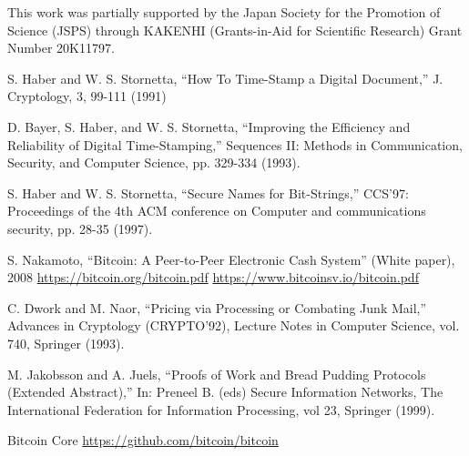 \documentclass[graybox]{svmult}
\begin{document}
\begin{acknowledgement}
 This work was partially supported by the Japan Society for the Promotion of 
Science (JSPS) through KAKENHI (Grants-in-Aid for Scientific Research) Grant 
Number 20K11797. 
\end{acknowledgement}







\begin{thebibliography}{99}

  S. Haber and W. S. Stornetta, 
  ``How To Time-Stamp a Digital Document,''
  J. Cryptology, 3, 99-111 (1991)

  D. Bayer, S. Haber, and W. S. Stornetta,
  ``Improving the Efficiency and Reliability of Digital Time-Stamping,''
  Sequences II: Methods in Communication, Security, and Computer Science, 
  pp. 329-334 (1993).

  S. Haber and W. S. Stornetta, 
  ``Secure Names for Bit-Strings,''
  CCS'97: Proceedings of the 4th ACM conference on Computer and 
  communications security, pp. 28-35 (1997).


  S. Nakamoto, 
  ``Bitcoin: A Peer-to-Peer Electronic Cash System''
  (White paper), 2008 
  \url{https://bitcoin.org/bitcoin.pdf}
  \url{https://www.bitcoinsv.io/bitcoin.pdf}


  C. Dwork and M. Naor, 
  ``Pricing via Processing or Combating Junk Mail,''
  Advances in Cryptology (CRYPTO'92), 
  Lecture Notes in Computer Science, vol. 740, Springer (1993). 


  M. Jakobsson and A. Juels, 
  ``Proofs of Work and Bread Pudding Protocols (Extended Abstract),''
  In: Preneel B. (eds) Secure Information Networks, 
  The International Federation for Information Processing, 
  vol 23, Springer (1999).


  Bitcoin Core 
  \url{https://github.com/bitcoin/bitcoin}



\end{thebibliography}
\end{document}
